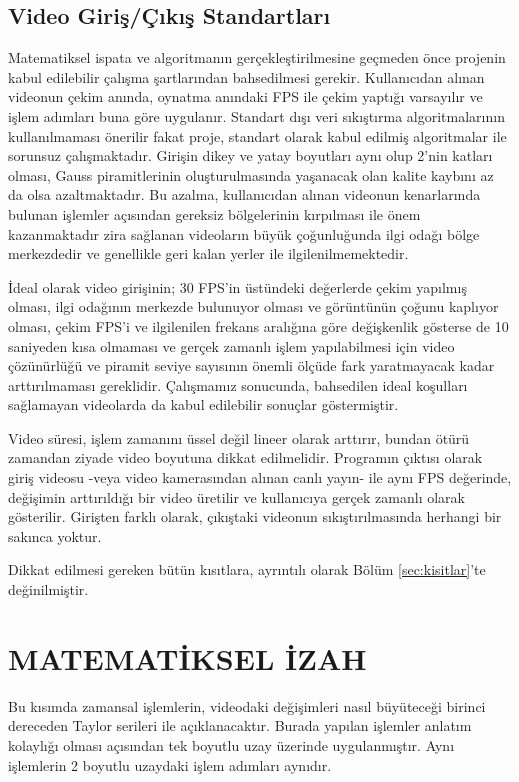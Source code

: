 \documentclass[a4paper, 12pt]{article}
\begin{document}
\subsection{Video Giriş/Çıkış Standartları}

Matematiksel ispata ve algoritmanın gerçekleştirilmesine geçmeden önce projenin kabul edilebilir çalışma şartlarından bahsedilmesi gerekir. Kullanıcıdan alınan videonun çekim anında, oynatma anındaki FPS ile çekim yaptığı varsayılır ve işlem adımları buna göre uygulanır. Standart dışı veri sıkıştırma algoritmalarının kullanılmaması önerilir fakat proje, standart olarak kabul edilmiş algoritmalar ile sorunsuz çalışmaktadır. Girişin dikey ve yatay boyutları aynı olup 2'nin katları olması, Gauss piramitlerinin oluşturulmasında yaşanacak olan kalite kaybını az da olsa azaltmaktadır. Bu azalma, kullanıcıdan alınan videonun kenarlarında bulunan işlemler açısından gereksiz bölgelerinin kırpılması ile önem kazanmaktadır zira sağlanan videoların büyük çoğunluğunda ilgi odağı bölge merkezdedir ve genellikle geri kalan yerler ile ilgilenilmemektedir. 

İdeal olarak video girişinin; 30 FPS'in üstündeki değerlerde çekim yapılmış olması, ilgi odağının merkezde bulunuyor olması ve görüntünün çoğunu kaplıyor olması, çekim FPS'i ve ilgilenilen frekans aralığına göre değişkenlik gösterse de 10 saniyeden kısa olmaması ve gerçek zamanlı işlem yapılabilmesi için video çözünürlüğü ve piramit seviye sayısının önemli ölçüde fark yaratmayacak kadar arttırılmaması gereklidir. Çalışmamız sonucunda, bahsedilen ideal koşulları sağlamayan videolarda da kabul edilebilir sonuçlar göstermiştir. 

Video süresi, işlem zamanını üssel değil lineer olarak arttırır, bundan ötürü zamandan ziyade video boyutuna dikkat edilmelidir. Programın çıktısı olarak giriş videosu -veya video kamerasından alınan canlı yayın- ile aynı FPS değerinde, değişimin arttırıldığı bir video üretilir ve kullanıcıya gerçek zamanlı olarak gösterilir. Girişten farklı olarak, çıkıştaki videonun sıkıştırılmasında herhangi bir sakınca yoktur.

Dikkat edilmesi gereken bütün kısıtlara, ayrıntılı olarak Bölüm \ref{sec:kisitlar}'te değinilmiştir. 
 


\newpage


\section{MATEMATİKSEL İZAH}
Bu kısımda zamansal işlemlerin, videodaki değişimleri nasıl büyüteceği birinci dereceden Taylor serileri ile açıklanacaktır. Burada yapılan işlemler anlatım kolaylığı olması açısından tek boyutlu uzay üzerinde uygulanmıştır. Aynı işlemlerin 2 boyutlu uzaydaki işlem adımları aynıdır. 
\end{document}
